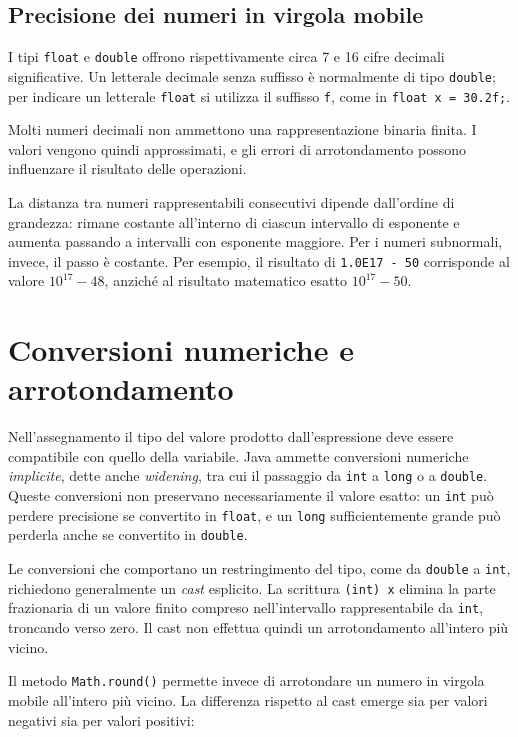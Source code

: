 \subsection{Precisione dei numeri in virgola mobile}
\label{sec:fi-java-precisione}

I tipi \texttt{float} e \texttt{double} offrono
rispettivamente circa 7 e 16 cifre decimali significative.
Un letterale decimale senza suffisso è normalmente di tipo
\texttt{double}; per indicare un letterale \texttt{float}
si utilizza il suffisso \texttt{f}, come in
\texttt{float x = 30.2f;}.

Molti numeri decimali non ammettono una rappresentazione
binaria finita. I valori vengono quindi approssimati, e gli
errori di arrotondamento possono influenzare il risultato
delle operazioni.

La distanza tra numeri rappresentabili consecutivi dipende
dall'ordine di grandezza: rimane costante all'interno di
ciascun intervallo di esponente e aumenta passando a
intervalli con esponente maggiore. Per i numeri subnormali,
invece, il passo è costante.
Per esempio, il risultato di \texttt{1.0E17 - 50}
corrisponde al valore \(10^{17}-48\), anziché al
risultato matematico esatto \(10^{17}-50\).

\clearpage

\section{Conversioni numeriche e arrotondamento}
\label{sec:fi-java-conversioni}

Nell'assegnamento il tipo del valore prodotto dall'espressione
deve essere compatibile con quello della variabile. Java ammette
conversioni numeriche \emph{implicite}, dette anche
\emph{widening}, tra cui il passaggio da \texttt{int} a
\texttt{long} o a \texttt{double}. Queste conversioni non
preservano necessariamente il valore esatto: un \texttt{int}
può perdere precisione se convertito in \texttt{float},
e un \texttt{long} sufficientemente grande può perderla
anche se convertito in \texttt{double}.

Le conversioni che comportano un restringimento del tipo,
come da \texttt{double} a \texttt{int}, richiedono generalmente
un \emph{cast} esplicito. La scrittura \texttt{(int) x}
elimina la parte frazionaria di un valore finito compreso
nell'intervallo rappresentabile da \texttt{int}, troncando
verso zero. Il cast non effettua quindi un arrotondamento
all'intero più vicino.

Il metodo \texttt{Math.round()} permette invece di arrotondare
un numero in virgola mobile all'intero più vicino.
La differenza rispetto al cast emerge sia per valori
negativi sia per valori positivi:

